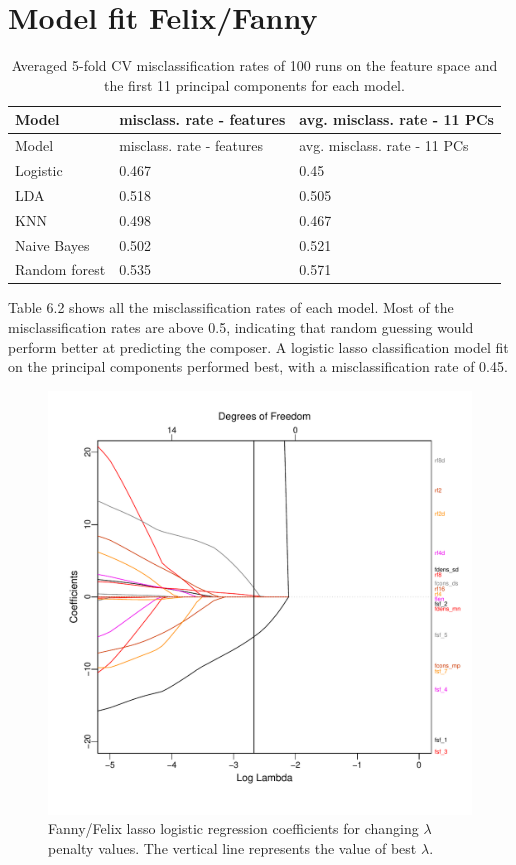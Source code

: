 \documentclass[12pt,twoside]{reedthesis}
\theoremstyle{definition}
\theoremstyle{definition}
\theoremstyle{definition}
\theoremstyle{remark}
\begin{document}
\section{Model fit Felix/Fanny}\label{model-fit-felixfanny}
\begin{longtable}[]{@{}lll@{}}
\caption{Averaged 5-fold CV misclassification rates of 100 runs on the
feature space and the first 11 principal components for each
model.}\tabularnewline
\toprule
Model & misclass. rate - features & avg. misclass. rate - 11
PCs\tabularnewline
\midrule
\endfirsthead
\toprule
Model & misclass. rate - features & avg. misclass. rate - 11
PCs\tabularnewline
\midrule
\endhead
Logistic & 0.467 & 0.45\tabularnewline
LDA & 0.518 & 0.505\tabularnewline
KNN & 0.498 & 0.467\tabularnewline
Naive Bayes & 0.502 & 0.521\tabularnewline
Random forest & 0.535 & 0.571\tabularnewline
\bottomrule
\end{longtable}
Table 6.2 shows all the misclassification rates of each model. Most of
the misclassification rates are above 0.5, indicating that random
guessing would perform better at predicting the composer. A logistic
lasso classification model fit on the principal components performed
best, with a misclassification rate of 0.45.
\begin{figure}[H]
\centering
\includegraphics[scale = .6]{images/loglambda_f.pdf}
\caption{Fanny/Felix lasso logistic regression coefficients for changing $\lambda$ penalty values. The vertical line represents the value of best $\lambda$.}
\label{subd}
\end{figure}
\end{document}
